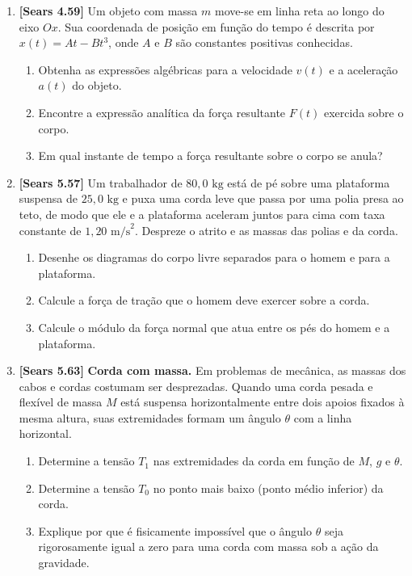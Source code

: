 \documentclass[11pt,a4paper]{article}
\begin{document}
\begin{enumerate}[label=\textbf{\arabic*.}, leftmargin=*, itemsep=0.45cm, resume]
\item \textbf{[Sears 4.59]} Um objeto com massa $m$ move-se em linha reta ao longo do eixo $Ox$. Sua coordenada de posição em função do tempo é descrita por $x(t) = A t - B t^3$, onde $A$ e $B$ são constantes positivas conhecidas.
\begin{enumerate}[label=\alph*)]
    \item Obtenha as expressões algébricas para a velocidade $v(t)$ e a aceleração $a(t)$ do objeto.
    \item Encontre a expressão analítica da força resultante $F(t)$ exercida sobre o corpo.
    \item Em qual instante de tempo a força resultante sobre o corpo se anula?
\end{enumerate}

\item \textbf{[Sears 5.57]} Um trabalhador de $80,0\text{ kg}$ está de pé sobre uma plataforma suspensa de $25,0\text{ kg}$ e puxa uma corda leve que passa por uma polia presa ao teto, de modo que ele e a plataforma aceleram juntos para cima com taxa constante de $1,20\text{ m/s}^2$. Despreze o atrito e as massas das polias e da corda.
\begin{enumerate}[label=\alph*)]
    \item Desenhe os diagramas do corpo livre separados para o homem e para a plataforma.
    \item Calcule a força de tração que o homem deve exercer sobre a corda.
    \item Calcule o módulo da força normal que atua entre os pés do homem e a plataforma.
\end{enumerate}

\item \textbf{[Sears 5.63]} \textbf{Corda com massa.} Em problemas de mecânica, as massas dos cabos e cordas costumam ser desprezadas. Quando uma corda pesada e flexível de massa $M$ está suspensa horizontalmente entre dois apoios fixados à mesma altura, suas extremidades formam um ângulo $\theta$ com a linha horizontal.
\begin{enumerate}[label=\alph*)]
    \item Determine a tensão $T_1$ nas extremidades da corda em função de $M$, $g$ e $\theta$.
    \item Determine a tensão $T_0$ no ponto mais baixo (ponto médio inferior) da corda.
    \item Explique por que é fisicamente impossível que o ângulo $\theta$ seja rigorosamente igual a zero para uma corda com massa sob a ação da gravidade.
\end{enumerate}


\end{enumerate}
\end{document}
